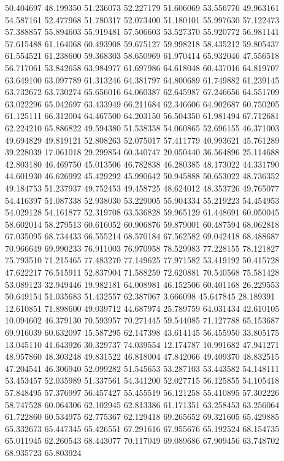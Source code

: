 50.404697
48.199350
51.236073
52.227179
51.606069
53.556776
49.963161
54.587161
52.477968
51.780317
52.073400
51.180101
55.997630
57.122473
57.388857
55.894603
55.919481
57.506603
53.527370
55.920772
56.981141
57.615488
61.164068
60.493908
59.675127
59.998218
58.435212
59.805437
61.554521
61.238600
59.368303
58.650969
61.970414
65.932046
47.556518
56.717061
53.842658
63.984977
61.697986
64.618048
60.437016
64.819707
63.649100
63.097789
61.313246
64.381797
64.800689
61.749882
61.239145
63.732672
63.730274
65.656016
64.060387
62.645987
67.246656
64.551709
63.022296
65.042697
63.433949
66.211684
62.346606
64.902687
60.750205
61.125111
66.312004
64.467500
64.203150
56.504350
61.981494
67.712681
62.224210
65.886822
49.594380
51.538358
54.060865
52.696155
46.371003
49.694829
49.819121
52.808263
52.075017
57.411779
40.993621
45.761289
39.228039
17.061018
29.299854
60.340747
20.050440
36.564896
25.114688
42.803180
46.469750
45.013506
46.782838
46.280385
48.173022
44.331790
44.601930
46.626992
45.429292
45.990642
50.945888
50.653022
48.736352
49.184753
51.237937
49.752453
49.458725
48.624012
48.353726
49.765077
54.416397
51.087338
52.938030
53.229005
55.904334
55.219223
54.454953
54.029128
54.161877
52.319708
63.536828
59.965129
61.448691
60.050045
58.602014
58.279513
60.616052
60.906876
59.879001
60.487594
68.062818
67.035095
68.734433
66.555214
68.570184
67.562582
69.042418
68.488687
70.966649
69.990233
76.911003
76.970958
78.529983
77.228155
78.121827
75.793510
71.215465
77.483270
77.149625
77.971582
53.419192
50.415728
47.622217
76.515911
52.837904
71.588259
72.620881
70.540568
75.581428
53.089123
32.949446
19.982181
64.008981
46.152506
60.401168
26.229553
50.649154
51.035683
51.432557
62.387067
3.666098
45.647845
28.189391
12.610851
71.898600
49.039712
44.687974
25.789759
64.031434
42.610105
10.094602
46.379130
70.593957
70.271445
59.544085
71.127788
65.153687
69.916039
60.632097
15.587295
62.147398
43.614145
56.455950
33.805175
13.045110
41.643926
30.329737
74.039554
12.174787
10.991682
47.941271
48.957860
48.303248
49.831522
46.818004
47.842066
49.409370
48.832515
47.204541
46.306940
52.099282
51.545653
53.287103
53.443582
54.148111
53.453457
52.035989
51.337561
54.341200
52.027715
56.125855
54.105418
57.848495
57.376997
56.457427
55.455519
56.121258
55.410895
57.302226
58.747528
60.064306
62.102945
62.813386
61.171351
63.258453
63.256064
61.722860
60.534975
62.775367
62.129418
69.265652
69.321605
65.429885
65.332673
65.447345
65.426551
67.291616
67.955676
65.192524
68.154735
65.011945
62.260543
68.443077
70.117049
69.089686
67.909456
63.748702
68.935723
65.803924
